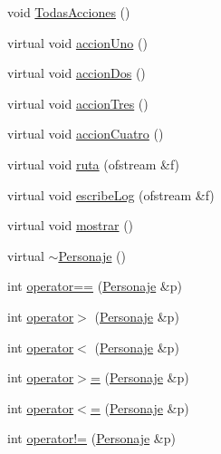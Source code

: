\begin{CompactItemize}
\item 
void \hyperlink{classPersonaje_786951aff09e227527d3da60338effec}{TodasAcciones} ()
\item 
virtual void \hyperlink{classPersonaje_0454b75ccc8f7e33f03e2cfb2c59e725}{accionUno} ()
\item 
virtual void \hyperlink{classPersonaje_af7763eb6099390038b7833129a1ef9f}{accionDos} ()
\item 
virtual void \hyperlink{classPersonaje_85c25ff0362bf4f4f5e69965c1ae4cfb}{accionTres} ()
\item 
virtual void \hyperlink{classPersonaje_3aed5959a6a829819e0b0a6dcca9c2e4}{accionCuatro} ()
\item 
virtual void \hyperlink{classPersonaje_f6dc20013805229005dfb87fc6f273b5}{ruta} (ofstream \&f)
\item 
virtual void \hyperlink{classPersonaje_86fe4a1ff708072d98c6be42bbd512ea}{escribeLog} (ofstream \&f)
\item 
virtual void \hyperlink{classPersonaje_e9f6bd8027b8a5c2e660a327d9e513ca}{mostrar} ()
\item 
virtual \hyperlink{classPersonaje_0b3c25862a6081aaee96e77c08edda29}{$\sim$Personaje} ()
\item 
int \hyperlink{classPersonaje_5870893672c215b1d99594233f7f5fd0}{operator==} (\hyperlink{classPersonaje}{Personaje} \&p)
\item 
int \hyperlink{classPersonaje_7717f9a6ad3d7b68a5c953930510f575}{operator$>$} (\hyperlink{classPersonaje}{Personaje} \&p)
\item 
int \hyperlink{classPersonaje_e55182c2fd21118b27c5e911f800c1d6}{operator$<$} (\hyperlink{classPersonaje}{Personaje} \&p)
\item 
int \hyperlink{classPersonaje_5b7fbb10c092e6f953738fa54a380e33}{operator$>$=} (\hyperlink{classPersonaje}{Personaje} \&p)
\item 
int \hyperlink{classPersonaje_824156240864cc79a8b7319985eaec58}{operator$<$=} (\hyperlink{classPersonaje}{Personaje} \&p)
\item 
int \hyperlink{classPersonaje_be7f26619dd67133806688d4306d877e}{operator!=} (\hyperlink{classPersonaje}{Personaje} \&p)
\end{CompactItemize}
